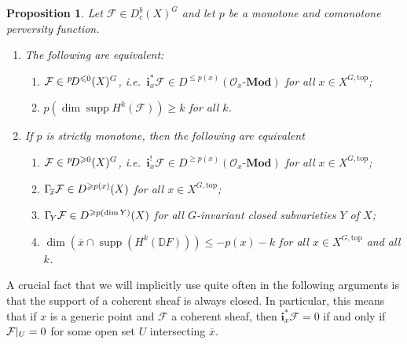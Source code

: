 \documentclass{compositio}
\theoremstyle{plain}
\newtheorem{Prop}[Thm]{Proposition}
\theoremstyle{definition}
\theoremstyle{remark}
\newcommand\sheaf{\mathcal}
\newcommand\cat{\mathbf}
\newcommand\catModules[1]{#1\text{-}\cat{Mod}}
\newcommand\supp{\operatorname{supp}}
\newcommand\res[2]{\mathchoice{\left.#1\right|_{#2}}{#1|_{#2}}{#1|_{#2}}{#1|_{#2}}}
\newcommand\perv[1][p]{\mkern1mu{}^{#1}\mkern-3mu}
\newcommand\dualize{\mathbb D}
\newcommand\lc[1]{\Gamma_{\mkern-3mu#1}}
\newcommand\Xtop[1][X]{#1^{G,\mathrm{top}}}
\begin{document}
\begin{Prop}\label{prop:equivDeligneKashiwara}%
    Let $\sheaf F \in  D_c^b(X)^G$ and let $p$ be a monotone and comonotone perversity function.
    \begin{enumerate}
        \item \label{li:prop:equivDeligneKashiwara:le}%
            The following are equivalent:
            \begin{enumerate}
                \item \label{li:prop:equivDeligneKashiwara:le:1}%
                    $\sheaf F \in  \perv D^{\leq 0}(X)^G$, i.e.\ $\mathbf i_x^*\sheaf F \in  D^{\leq p(x)}(\catModules{\sheaf{O}_x})$ for all $x \in  \Xtop$;
                \item \label{li:prop:equivDeligneKashiwara:le:2}%
                    $p(\dim \supp H^{k}(\sheaf F)) \geq  k$ for all $k$.
            \end{enumerate}
        \item \label{li:prop:equivDeligneKashiwara:ge}%
            If $p$ is strictly monotone, then the following are equivalent
            \begin{enumerate}
                \item \label{li:prop:equivDeligneKashiwara:ge:1}%
                    $\sheaf F \in  \perv D^{\ge 0}(X)^G$, i.e.\ $\mathbf i_x^!\sheaf F \in  D^{\geq p(x)}(\catModules{\sheaf{O}_x})$ for all $x \in  \Xtop$;
                \item \label{li:prop:equivDeligneKashiwara:ge:2}%
                    $\lc {\overline x}\sheaf F \in  D^{\geq p(x)}(X)$ for all $x \in  \Xtop$;
                \item \label{li:prop:equivDeligneKashiwara:ge:3}%
                    $\lc {Y}\sheaf F \in  D^{\geq p(\dim Y)}(X)$ for all $G$-invariant closed subvarieties $Y$ of $X$;
                \item \label{li:prop:equivDeligneKashiwara:ge:4}%
                    $\dim\left( \overline x \cap  \supp\left( H^k(\dualize F) \right) \right) \leq  -p(x) - k$ for all $x \in  \Xtop$ and all $k$.
            \end{enumerate}
    \end{enumerate}
\end{Prop}

A crucial fact that we will implicitly use quite often in the following arguments is that the support of a coherent sheaf is always closed.
In particular, this means that if $x$ is a generic point and $\sheaf F$ a coherent sheaf, then $\mathbf i_x^* \sheaf F = 0$ if and only if $\res{\sheaf F}U = 0$ for some open set $U$ intersecting $\overline x$.
\end{document}
